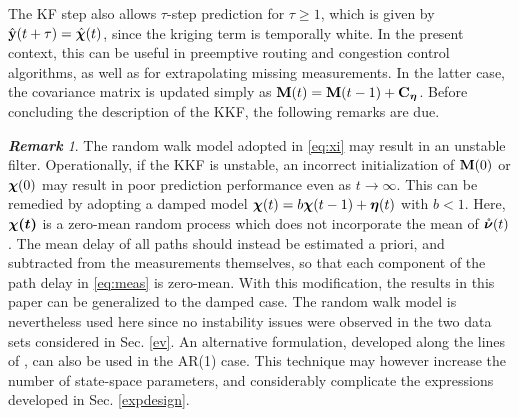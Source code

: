 \documentclass[draftcls,onecolumn,12pt]{IEEEtran}
\newcommand{\mr}[1]{\ensuremath{\mathring{#1}}}
\def \y {{\b{y}}}
\def \chih {{\hat{\bs{\chi}}}}
\def \ceta {{\b{C}_{\bs{\eta}}}}
\theoremstyle{plain}\newtheorem{thm}{Theorem}
\theoremstyle{definition}
\theoremstyle{remark}
\newtheorem{rem}{\bf Remark}
\begin{document}
The KF step also allows $\tau$-step prediction for $\tau\geq 1$, which is given by $\hat{\y}(t+\tau) = \chih(t)$, since the kriging term is temporally white. 
In the present context, this can be useful in preemptive routing and congestion control algorithms, as well as for extrapolating missing measurements. 
In the latter case, the covariance matrix is updated simply as $\b{M}(t) = \b{M}(t-1)+\ceta$.
Before concluding the description of the KKF, the following remarks are due.
\begin{rem}
The random walk model adopted in \eqref{eq:xi} may result in an unstable filter. Operationally, if the KKF is unstable, an incorrect initialization of $\mathbf{M}(0)$ or $\boldsymbol{\chi}(0)$ may result in poor prediction performance even as $t \rightarrow \infty$.
This can be remedied by adopting a damped model $\boldsymbol{\chi}(t) = b\boldsymbol{\chi}(t-1) + \boldsymbol{\eta}(t)$ with $b < 1$. { Here, $\boldsymbol{\chi(t)}$ is a zero-mean random process which does not incorporate the mean of $\mr{\bs{\nu}}(t)$. The mean delay of all paths should instead be estimated a priori, and subtracted from the measurements themselves, so that each component of the path delay in \eqref{eq:meas} is zero-mean.}
With this modification, the results in this paper can be generalized to the damped case. 
The random walk model is nevertheless used here since no instability issues were observed in the two data sets considered in Sec. \ref{ev}.
{ An alternative formulation, developed along the lines of \cite{casas}, can also be used in the AR(1) case. This technique may however increase the number of state-space parameters, and considerably complicate the expressions developed in Sec. \ref{expdesign}.}
\end{rem}
\end{document}
